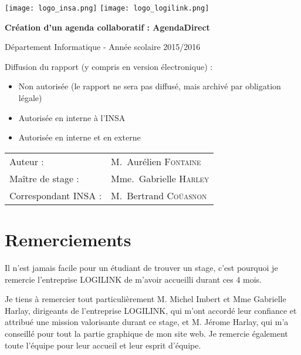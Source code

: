 \documentclass[a4paper, 11pt]{report}
\begin{document}
\renewcommand{\bibname}{Réferences}

\begin{titlepage}
    \texttt{[image: logo\_insa.png]}
    \hspace{0.35\textwidth}
    \texttt{[image: logo\_logilink.png]}
    \begin{center}
        \vspace{7cm}
        {\huge\bfseries Création d'un agenda collaboratif : AgendaDirect \par}
        \vspace{0.5cm}
        {\Large Département Informatique - Année scolaire 2015/2016\par}
    \end{center}
    \vfill

    Diffusion du rapport (y compris en version électronique) :

    \begin{itemize}[label=$\square$]
        \item Non autorisée (le rapport ne sera pas diffusé, mais archivé par obligation légale)
        \item Autorisée en interne à l’INSA
        \item Autorisée en interne et en externe
    \end{itemize}

    \vspace{0.5cm}

    \begin{tabular}{ll}
        {\Large Auteur :}             & M.~Aurélien \textsc{Fontaine}\\
        {\Large Maître de stage :}    & Mme.~Gabrielle \textsc{Harley}\\
        {\Large Correspondant INSA :} & M.~Bertrand \textsc{Coüasnon}\\
    \end{tabular}
\end{titlepage}

\chapter*{Remerciements}

Il n'est jamais facile pour un étudiant de trouver un stage, c'est pourquoi je remercie l'entreprise LOGILINK de m'avoir accueilli durant ces 4 mois.

Je tiens à remercier tout particulièrement M. Michel Imbert et Mme Gabrielle Harlay, dirigeants de l'entreprise LOGILINK,  qui m'ont accordé leur confiance et attribué une mission valorisante durant ce stage, et M. Jérome Harlay, qui m'a conseillé pour tout la partie graphique de mon site web. Je remercie également toute l'équipe pour leur accueil et leur esprit d'équipe.
\end{document}
